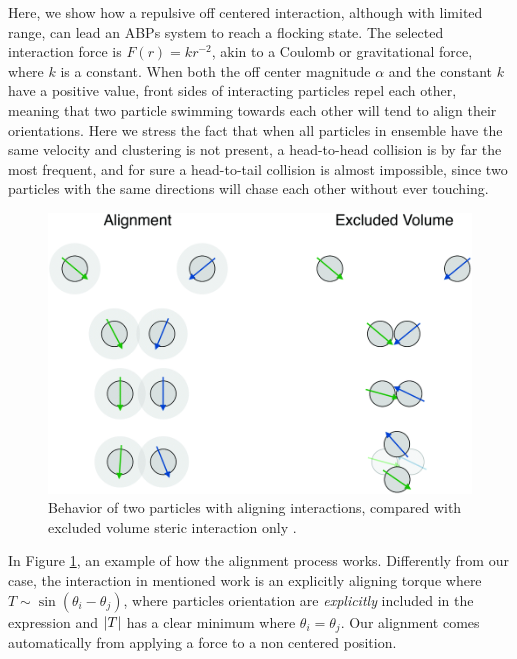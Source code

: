 \documentclass[../../master_thesis_np.tex]{subfiles}
\begin{document}
		Here, we show how a repulsive off centered interaction, although with limited range, can lead an ABPs system to reach a flocking state. The selected interaction force is $F(r) = kr^{-2}$, akin to a Coulomb or gravitational force, where $k$ is a constant. When both the off center magnitude $\alpha$ and the constant $k$ have a positive value, front sides of interacting particles repel each other, meaning that two particle swimming towards each other will tend to align their orientations. Here we stress the fact that when all particles in ensemble have the same velocity and clustering is not present, a head-to-head collision is by far the most frequent, and for sure a head-to-tail collision is almost impossible, since two particles with the same directions will chase each other without ever touching.
		
		\begin{figure}[htp]
			\centering
			\includegraphics[width=\textwidth]{alignment.png}
			\caption{Behavior of two particles with aligning interactions, compared with excluded volume steric interaction only \citeauthor{martin-gomez_collective_2018}.}
			\label{fig:alignment}
		\end{figure}
		
		In Figure \ref{fig:alignment}, an example of how the alignment process works. Differently from our case, the interaction in mentioned work is an explicitly aligning torque where $T \sim \sin( \theta_{i}-\theta_{j} )$, where particles orientation are \emph{explicitly} included in the expression and $\abs{T}$ has a clear minimum where $\theta_{i} = \theta_{j}$. Our alignment comes automatically from applying a force to a non centered position. 
		
\end{document}
